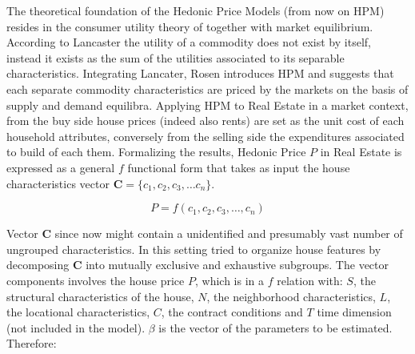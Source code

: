 \documentclass[
  12pt,
  a4paper,
  oneside]{book}
\theoremstyle{definition}
\theoremstyle{definition}
\theoremstyle{definition}
\theoremstyle{remark}
\begin{document}
The theoretical foundation of the Hedonic Price Models (from now on HPM) resides in the consumer utility theory of \citet{Lancaster} together with \citet{Rosen} market equilibrium. According to Lancaster the utility of a commodity does not exist by itself, instead it exists as the sum of the utilities associated to its separable characteristics. Integrating Lancater, Rosen introduces HPM and suggests that each separate commodity characteristics are priced by the markets on the basis of supply and demand equilibra. Applying HPM to Real Estate in a market context, from the buy side house prices (indeed also rents) are set as the unit cost of each household attributes, conversely from the selling side the expenditures associated to build of each them.
Formalizing the results, Hedonic Price \(P\) in Real Estate is expressed as a general \(f\) functional form that takes as input the house characteristics vector \(\mathbf{C} = \{c_1,c_2, c_3, \ldots c_n\}\).

\[P=f\left(c_{1}, c_{2}, c_{3}, \ldots, c_{n}\right)\]

Vector \(\mathbf{C}\) since now might contain a unidentified and presumably vast number of ungrouped characteristics. In this setting \citet{Malpezzi} tried to organize house features by decomposing \(\mathbf{C}\) into mutually exclusive and exhaustive subgroups. The vector components involves the house price \(P\), which is in a \(f\) relation with: \(S\), the structural characteristics of the house, \(N\), the neighborhood characteristics, \(L\), the locational characteristics, \(C\), the contract conditions and \(T\) time dimension (not included in the model). \(\beta\) is the vector of the parameters to be estimated. Therefore:
\end{document}
